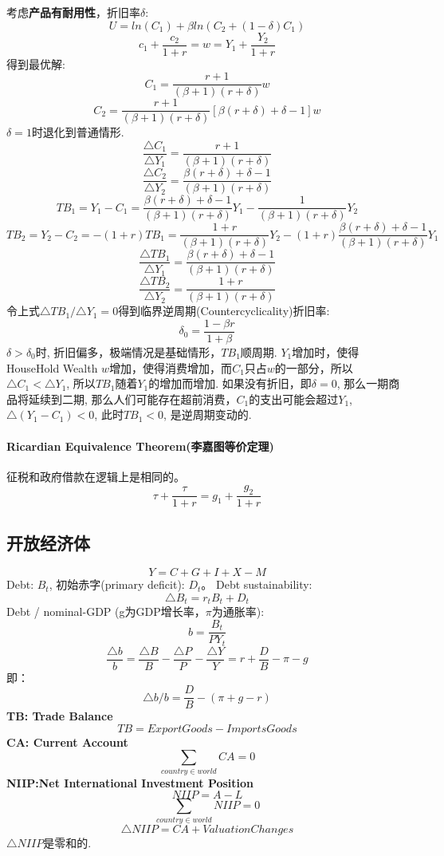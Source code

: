 \documentclass[UTF8, onecolumn, a4paper, 12pt]{article}
\begin{document}
考虑\textbf{产品有耐用性}，折旧率$\delta$:
$$U = ln(C_1) + \beta ln(C_2 + (1 - \delta)C_1)$$
$$c_1 + \frac{c_2}{1+r} = w = Y_1 + \frac{Y_2}{1+r}$$
得到最优解:
$$C_1 = \frac{r+1}{(\beta+1)(r+\delta)}w$$
$$C_2 = \frac{r+1}{(\beta+1)(r+\delta)}\left[\beta(r+\delta)+\delta-1\right]w$$
$\delta=1$时退化到普通情形.
$$\frac{\triangle C_1}{\triangle Y_1} = \frac{r+1}{(\beta+1)(r+\delta)}$$
$$\frac{\triangle C_2}{\triangle Y_2} = \frac{\beta(r+\delta)+\delta-1}{(\beta+1)(r+\delta)}$$
$$TB_1 = Y_1 - C_1 = \frac{\beta(r+\delta)+\delta-1}{(\beta+1)(r+\delta)}Y_1 - \frac{1}{(\beta+1)(r+\delta)}Y_2$$
$$TB_2 = Y_2 - C_2 = -(1+r)TB_1 = \frac{1+r}{(\beta+1)(r+\delta)}Y_2 - (1+r)\frac{\beta(r+\delta)+\delta-1}{(\beta+1)(r+\delta)}Y_1$$
$$\frac{\triangle TB_1}{\triangle Y_1} = \frac{\beta(r+\delta)+\delta-1}{(\beta+1)(r+\delta)}$$
$$\frac{\triangle TB_2}{\triangle Y_2} = \frac{1+r}{(\beta+1)(r+\delta)}$$
令上式$\triangle TB_1 / \triangle Y_1 = 0$得到临界逆周期(Countercyclicality)折旧率:
$$\delta_0 = \frac{1-\beta r}{1+\beta}$$
$\delta > \delta_0$时, 折旧偏多，极端情况是基础情形，$TB_1$顺周期.
$Y_1$增加时，使得HouseHold Wealth $w$增加，使得消费增加，而$C_1$只占$w$的一部分，所以$\triangle C_1 < \triangle Y_1$, 所以$TB_1$随着$Y_1$的增加而增加.
如果没有折旧，即$\delta = 0$, 那么一期商品将延续到二期, 那么人们可能存在超前消费，$C_1$的支出可能会超过$Y_1$, $\triangle(Y_1-C_1) < 0$, 此时$TB_1 < 0$, 是逆周期变动的.
\paragraph{Ricardian Equivalence Theorem(李嘉图等价定理)}
征税和政府借款在逻辑上是相同的。
$$\tau + \frac{\tau}{1+r} = g_1 + \frac{g_2}{1+r}$$
\subsection{开放经济体}
$$Y = C+G+I +X-M$$
Debt: $B_t$, 初始赤字(primary deficit): $D_t$。 Debt sustainability:
$$\triangle B_t = r_tB_t + D_t$$
Debt / nominal-GDP (g为GDP增长率，$\pi$为通胀率):
$$b = \frac{B_t}{PY_t}$$
$$\frac{\triangle b}{b} = \frac{\triangle B}{B} - \frac{\triangle P}{P} - \frac{\triangle Y}{Y} = r + \frac{D}{B} - \pi - g$$
即：
$$\triangle b/b = \frac{D}{B} - (\pi + g - r)$$
\textbf{TB: Trade Balance}
$$TB = ExportGoods - ImportsGoods$$
\textbf{CA: Current Account}
$$\sum_{country\in world}CA = 0$$
\textbf{NIIP:Net International Investment Position}
$$NIIP = A - L$$
$$\sum_{country\in world}NIIP = 0$$
$$\triangle NIIP = CA + ValuationChanges$$
$\triangle NIIP$是零和的.
\end{document}
